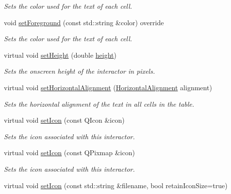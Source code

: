 \begin{DoxyCompactItemize}
\begin{DoxyCompactList}\small\item\em Sets the color used for the text of each cell. \end{DoxyCompactList}\item 
void \mbox{\hyperlink{classsgl_1_1GTable_a8afbcf1f47750fb4c717f9ff36540235}{set\+Foreground}} (const std\+::string \&color) override
\begin{DoxyCompactList}\small\item\em Sets the color used for the text of each cell. \end{DoxyCompactList}\item 
virtual void \mbox{\hyperlink{classsgl_1_1GInteractor_a9e280bfc4544dfaf8e4376c4e1a74357}{set\+Height}} (double \mbox{\hyperlink{classsgl_1_1GTable_ad3774f6419003470f54fd495124ef51f}{height}})
\begin{DoxyCompactList}\small\item\em Sets the onscreen height of the interactor in pixels. \end{DoxyCompactList}\item 
virtual void \mbox{\hyperlink{classsgl_1_1GTable_a04e6ce745dd0f9708f14dedc68ec8b18}{set\+Horizontal\+Alignment}} (\mbox{\hyperlink{namespacesgl_aa00e70829e72ff16addc4d9f06fe3bc5}{Horizontal\+Alignment}} alignment)
\begin{DoxyCompactList}\small\item\em Sets the horizontal alignment of the text in all cells in the table. \end{DoxyCompactList}\item 
virtual void \mbox{\hyperlink{classsgl_1_1GInteractor_a542abfcd7261751352af129c7215ecda}{set\+Icon}} (const Q\+Icon \&icon)
\begin{DoxyCompactList}\small\item\em Sets the icon associated with this interactor. \end{DoxyCompactList}\item 
virtual void \mbox{\hyperlink{classsgl_1_1GInteractor_a368e1a338f84401c284506d03b1ba769}{set\+Icon}} (const Q\+Pixmap \&icon)
\begin{DoxyCompactList}\small\item\em Sets the icon associated with this interactor. \end{DoxyCompactList}\item 
virtual void \mbox{\hyperlink{classsgl_1_1GInteractor_a762e139aa311461c3984d3ad28293f64}{set\+Icon}} (const std\+::string \&filename, bool retain\+Icon\+Size=true)

\end{DoxyCompactItemize}
